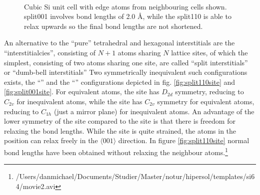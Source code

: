 \documentclass[11pt,bibliography=totoc,index=totoc]{scrbook}   %
\begin{document}
\begin{figure}[htbp]
  \centering
  \\
  \caption{Cubic Si unit cell with edge atoms from neighbouring cells shown.
  split001 involves bond lengths of 2.0 Å,
  while the split110 is able to relax upwards so the final bond lengths are not shortened.
  }
  \label{fig:interstitials}
\end{figure}

An alternative to the ``pure'' tetrahedral and hexagonal interstitials are the ``interstitialcies'', consisting of $N+1$ atoms sharing $N$ lattice sites, of which the simplest, consisting of two atoms sharing one site, are called ``split interstitials'' or ``dumb-bell interstitials''\cite[6]{Pichler:2004}
Two symmetrically inequivalent such configurations exists, the ``'' and the ``'' configurations depicted in fig. \ref{fig:split110site} and \ref{fig:split001site}.
For equivalent atoms, the  site has $D_{2d}$ symmetry, reducing to $C_{2v}$ for inequivalent atoms,
while the  site has $C_{2v}$ symmetry for equivalent atoms, reducing to $C_{1h}$ (just a mirror plane) for inequivalent atoms.
An advantage of the lower symmetry of the  site compared to the  site is that there is freedom for relaxing the bond lengths. 
While the  site is quite strained, the atoms in the  position can relax freely in the $\langle 001 \rangle$ direction. 
In figure \ref{fig:split110site} normal bond lengths have been obtained without relaxing the neighbour atoms.\footnote{
/Users/danmichael/Documents/Studier/Master/notur/hipersol/templates/si64/movie2.avi }
\end{document}
